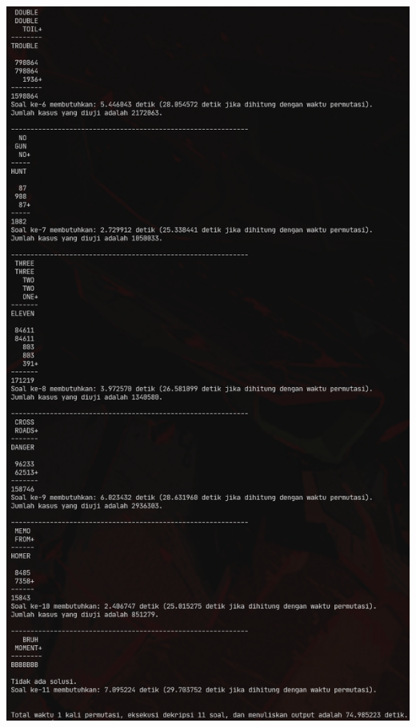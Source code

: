 \documentclass{article}
\let\origfigure\figure
\let\endorigfigure\endfigure
\renewenvironment{figure}[1][2] {
    \expandafter\origfigure\expandafter[H]
} {
    \endorigfigure
}
\begin{document}
\begin{figure}
  \includegraphics[scale = 0.9]{stima-ss-2.png}
  \caption{Luaran program dekripsi untuk soal 6 sampai 11}
\end{figure}
\end{document}
